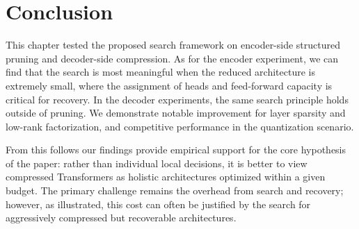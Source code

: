 \section{Conclusion}
\label{chap:results_conclusion}

This chapter tested the proposed search framework on encoder-side structured pruning and decoder-side compression. As for the encoder experiment, we can find that the search is most meaningful when the reduced architecture is extremely small, where the assignment of heads and feed-forward capacity is critical for recovery. In the decoder experiments, the same search principle holds outside of pruning. We demonstrate notable improvement for layer sparsity and low-rank factorization, and competitive performance in the quantization scenario.

From this follows our findings provide empirical support for the core hypothesis of the paper: rather than individual local decisions, it is better to view compressed Transformers as holistic architectures optimized within a given budget. The primary challenge remains the overhead from search and recovery; however, as illustrated, this cost can often be justified by the search for aggressively compressed but recoverable architectures.